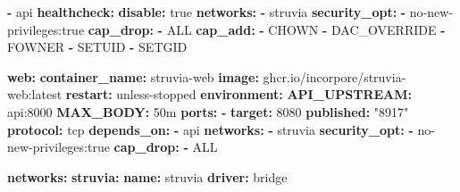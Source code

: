 \documentclass[
  10pt,
]{article}
\newenvironment{Shaded}{\begin{snugshade}}{\end{snugshade}}
\newcommand{\AttributeTok}[1]{\textcolor[rgb]{0.13,0.29,0.53}{#1}}
\newcommand{\CharTok}[1]{\textcolor[rgb]{0.31,0.60,0.02}{#1}}
\newcommand{\DecValTok}[1]{\textcolor[rgb]{0.00,0.00,0.81}{#1}}
\newcommand{\FunctionTok}[1]{\textcolor[rgb]{0.13,0.29,0.53}{\textbf{#1}}}
\newcommand{\KeywordTok}[1]{\textcolor[rgb]{0.13,0.29,0.53}{\textbf{#1}}}
\newcommand{\StringTok}[1]{\textcolor[rgb]{0.31,0.60,0.02}{#1}}
\begin{document}
\begin{Shaded}
\begin{Highlighting}[]
\AttributeTok{      }\KeywordTok{{-}}\AttributeTok{ api}
\AttributeTok{    }\FunctionTok{healthcheck}\KeywordTok{:}
\AttributeTok{      }\FunctionTok{disable}\KeywordTok{:}\AttributeTok{ }\CharTok{true}
\AttributeTok{    }\FunctionTok{networks}\KeywordTok{:}
\AttributeTok{      }\KeywordTok{{-}}\AttributeTok{ struvia}
\AttributeTok{    }\FunctionTok{security\_opt}\KeywordTok{:}
\AttributeTok{      }\KeywordTok{{-}}\AttributeTok{ no{-}new{-}privileges:true}
\AttributeTok{    }\FunctionTok{cap\_drop}\KeywordTok{:}
\AttributeTok{      }\KeywordTok{{-}}\AttributeTok{ ALL}
\AttributeTok{    }\FunctionTok{cap\_add}\KeywordTok{:}
\AttributeTok{      }\KeywordTok{{-}}\AttributeTok{ CHOWN}
\AttributeTok{      }\KeywordTok{{-}}\AttributeTok{ DAC\_OVERRIDE}
\AttributeTok{      }\KeywordTok{{-}}\AttributeTok{ FOWNER}
\AttributeTok{      }\KeywordTok{{-}}\AttributeTok{ SETUID}
\AttributeTok{      }\KeywordTok{{-}}\AttributeTok{ SETGID}

\AttributeTok{  }\FunctionTok{web}\KeywordTok{:}
\AttributeTok{    }\FunctionTok{container\_name}\KeywordTok{:}\AttributeTok{ struvia{-}web}
\AttributeTok{    }\FunctionTok{image}\KeywordTok{:}\AttributeTok{ ghcr.io/incorpore/struvia{-}web:latest}
\AttributeTok{    }\FunctionTok{restart}\KeywordTok{:}\AttributeTok{ unless{-}stopped}
\AttributeTok{    }\FunctionTok{environment}\KeywordTok{:}
\AttributeTok{      }\FunctionTok{API\_UPSTREAM}\KeywordTok{:}\AttributeTok{ api:8000}
\AttributeTok{      }\FunctionTok{MAX\_BODY}\KeywordTok{:}\AttributeTok{ 50m}
\AttributeTok{    }\FunctionTok{ports}\KeywordTok{:}
\AttributeTok{      }\KeywordTok{{-}}\AttributeTok{ }\FunctionTok{target}\KeywordTok{:}\AttributeTok{ }\DecValTok{8080}
\AttributeTok{        }\FunctionTok{published}\KeywordTok{:}\AttributeTok{ }\StringTok{"8917"}
\AttributeTok{        }\FunctionTok{protocol}\KeywordTok{:}\AttributeTok{ tcp}
\AttributeTok{    }\FunctionTok{depends\_on}\KeywordTok{:}
\AttributeTok{      }\KeywordTok{{-}}\AttributeTok{ api}
\AttributeTok{    }\FunctionTok{networks}\KeywordTok{:}
\AttributeTok{      }\KeywordTok{{-}}\AttributeTok{ struvia}
\AttributeTok{    }\FunctionTok{security\_opt}\KeywordTok{:}
\AttributeTok{      }\KeywordTok{{-}}\AttributeTok{ no{-}new{-}privileges:true}
\AttributeTok{    }\FunctionTok{cap\_drop}\KeywordTok{:}
\AttributeTok{      }\KeywordTok{{-}}\AttributeTok{ ALL}

\FunctionTok{networks}\KeywordTok{:}
\AttributeTok{  }\FunctionTok{struvia}\KeywordTok{:}
\AttributeTok{    }\FunctionTok{name}\KeywordTok{:}\AttributeTok{ struvia}
\AttributeTok{    }\FunctionTok{driver}\KeywordTok{:}\AttributeTok{ bridge}


\end{Highlighting}
\end{Shaded}
\end{document}
